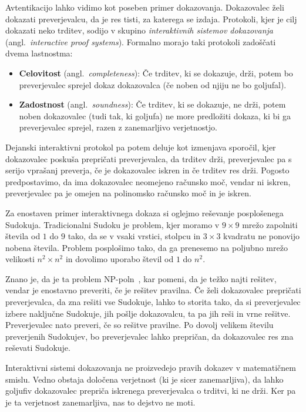 \documentclass[isrm2, tisk]{fmfdelo}
\begin{document}
Avtentikacijo lahko vidimo kot poseben primer dokazovanja. Dokazovalec želi dokazati preverjevalcu, da
je res tisti, za katerega se izdaja. Protokoli, kjer je cilj dokazati neko trditev, sodijo v skupino
\textit{interaktivnih sistemov dokazovanja} (angl.\ \textit{interactive proof systems}). Formalno
morajo taki protokoli zadoščati dvema lastnostma:
\begin{itemize}
    \item \textbf{Celovitost} (angl.\ \textit{completeness}): Če trditev, ki se dokazuje,
        drži, potem bo preverjevalec sprejel dokaz dokazovalca (če noben od njiju ne bo goljufal).
    \item \textbf{Zadostnost} (angl.\ \textit{soundness}): Če trditev, ki se dokazuje, ne
        drži, potem noben dokazovalec (tudi tak, ki goljufa) ne more predložiti dokaza, ki bi 
        ga preverjevalec sprejel, razen z zanemarljivo verjetnostjo.
\end{itemize}
Dejanski interaktivni protokol pa potem deluje kot izmenjava sporočil, kjer dokazovalec poskuša
prepričati preverjevalca, da trditev drži, preverjevalec pa s serijo vprašanj preverja, če je
dokazovalec iskren in če trditev res drži. Pogosto predpostavimo, da ima dokazovalec neomejeno
računsko moč, vendar ni iskren, preverjevalec pa je omejen na polinomsko računsko moč in je iskren.

\begin{primer}
    Za enostaven primer interaktivnega dokaza si oglejmo reševanje posplošenega Sudokuja. Tradicionalni
    Sudoku je problem, kjer moramo v $9 \times 9$ mrežo zapolniti števila od $1$ do $9$ tako, da se v vsaki
    vrstici, stolpcu in $3 \times 3$ kvadratu ne ponovijo nobena števila. Problem posplošimo tako, da
    ga prenesemo na poljubno mrežo velikosti $n^2 \times n^2$ in dovolimo uporabo števil od $1$ do $n^2$.

    Znano je, da je ta problem NP-poln~\cite{yato2003sudoku}, kar pomeni, da je težko najti rešitev,
    vendar je enostavno preveriti, če je rešitev pravilna. Če želi dokazovalec prepričati preverjevalca,
    da zna rešiti vse Sudokuje, lahko to storita tako, da si preverjevalec izbere naključne Sudokuje,
    jih pošlje dokazovalcu, ta pa jih reši in vrne rešitve. Preverjevalec nato preveri, če so rešitve pravilne.
    Po dovolj velikem številu preverjenih Sudokujev, bo preverjevalec lahko prepričan, da dokazovalec
    res zna reševati Sudokuje.
\end{primer}

\begin{opomba}
    Interaktivni sistemi dokazovanja ne proizvedejo pravih dokazev v matematičnem smislu. Vedno
    obstaja določena verjetnost (ki je sicer zanemarljiva), da lahko goljufiv dokazovalec prepriča
    iskrenega preverjevalca o trditvi, ki ne drži. Ker pa je ta verjetnost zanemarljiva, nas to
    dejstvo ne moti.
\end{opomba}
\end{document}
